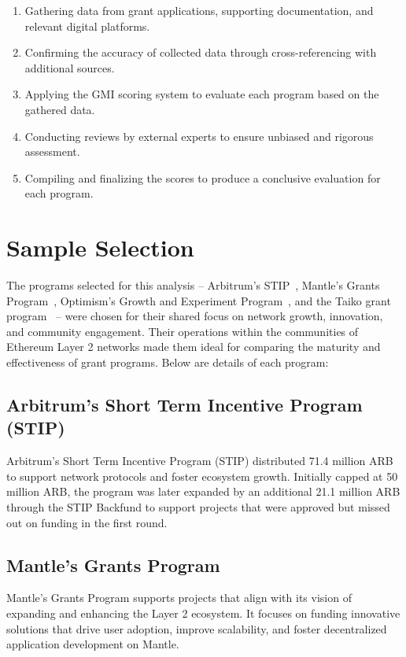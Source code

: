\documentclass[a4,10pt]{article}
\begin{document}
\begin{enumerate}
    \item Gathering data from grant applications, supporting documentation, and relevant digital platforms.
    \item Confirming the accuracy of collected data through cross-referencing with additional sources.
    \item Applying the GMI scoring system to evaluate each program based on the gathered data.
    \item Conducting reviews by external experts to ensure unbiased and rigorous assessment.
    \item Compiling and finalizing the scores to produce a conclusive evaluation for each program.
\end{enumerate}

\section{Sample Selection}\label{sec_6}
The programs selected for this analysis -- Arbitrum's STIP~\cite{15}, Mantle's Grants Program~\cite{16}, Optimism’s Growth and Experiment Program~\cite{17}, and the Taiko grant program~\cite{18} -- were chosen for their shared focus on network growth, innovation, and community engagement. Their operations within the communities of Ethereum Layer 2 networks made them ideal for comparing the maturity and effectiveness of grant programs. Below are details of each program:

\subsection{Arbitrum's Short Term Incentive Program (STIP)}\label{sec_6.1}
Arbitrum's Short Term Incentive Program (STIP) distributed 71.4 million ARB to support network protocols and foster ecosystem growth. Initially capped at 50 million ARB, the program was later expanded by an additional 21.1 million ARB through the STIP Backfund to support projects that were approved but missed out on funding in the first round.

\subsection{Mantle's Grants Program}\label{sec_6.2}
Mantle's Grants Program supports projects that align with its vision of expanding and enhancing the Layer 2 ecosystem. It focuses on funding innovative solutions that drive user adoption, improve scalability, and foster decentralized application development on Mantle.
\end{document}
